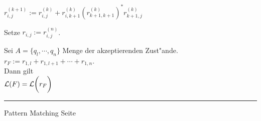 \begin{slide}{}
\begin{enumerate}
      \hspace*{1.3cm} $r_{i,j}^{(k+1)} := r_{i,j}^{(k)} + r_{i,k+1}^{(k)} \left(r_{k+1,k+1}^{(k)}\right)^* r_{k+1,j}^{(k)}$ 
\end{enumerate}
Setze  $r_{i,j} := r_{i,j}^{(n)}$.

Sei $A = \{q_l, \cdots, q_n\}$ Menge der akzeptierenden Zust"ande. \\[0.3cm]
\hspace*{1.3cm}  $r_F := r_{1,l} + r_{1,l+1} + \cdots + r_{1,n}$. \\[0.3cm]
 Dann gilt \\[0.3cm]
\hspace*{1.3cm} ${\cal L}(F) = {\cal L}\bigg(r_F\bigg)$ 

\vspace*{\fill}
\tiny \addtocounter{mypage}{1}
\rule{17cm}{1mm}
Pattern Matching \hspace*{\fill} Seite 
\end{slide}


